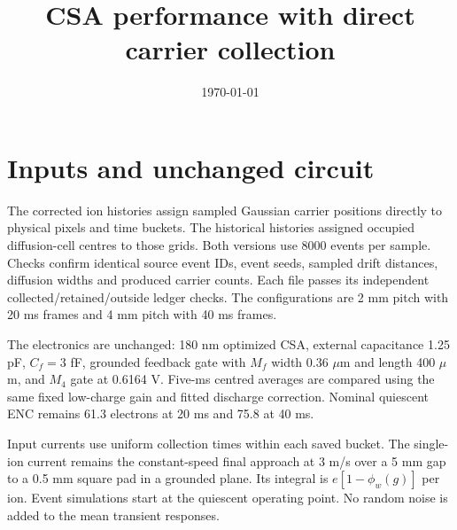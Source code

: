 \documentclass[11pt,a4paper]{article}
\title{CSA performance with direct carrier collection}
\date{\today}
\begin{document}
\maketitle
\section{Inputs and unchanged circuit}
The corrected ion histories assign sampled Gaussian carrier positions directly
to physical pixels and time buckets. The historical histories assigned occupied
diffusion-cell centres to those grids. Both versions use 8000 events per sample.
Checks confirm identical source event IDs, event seeds, sampled drift distances,
diffusion widths and produced carrier counts. Each file passes its independent
collected/retained/outside ledger checks. The configurations are 2 mm pitch with
20 ms frames and 4 mm pitch with 40 ms frames.

The electronics are unchanged: 180 nm optimized CSA, external capacitance
1.25 pF, $C_f=3$ fF, grounded feedback gate with $M_f$ width 0.36 $\mu$m and
length 400 $\mu$m, and $M_4$ gate at 0.6164 V. Five-ms centred averages are
compared using the same fixed low-charge gain and fitted discharge correction.
Nominal quiescent ENC remains 61.3 electrons at 20 ms and 75.8 at 40 ms.

Input currents use uniform collection times within each saved bucket. The
single-ion current remains the constant-speed final approach at 3 m/s over a
5 mm gap to a 0.5 mm square pad in a grounded plane. Its integral is
$e[1-\phi_w(g)]$ per ion. Event simulations start at the quiescent operating
point. No random noise is added to the mean transient responses.
\end{document}
